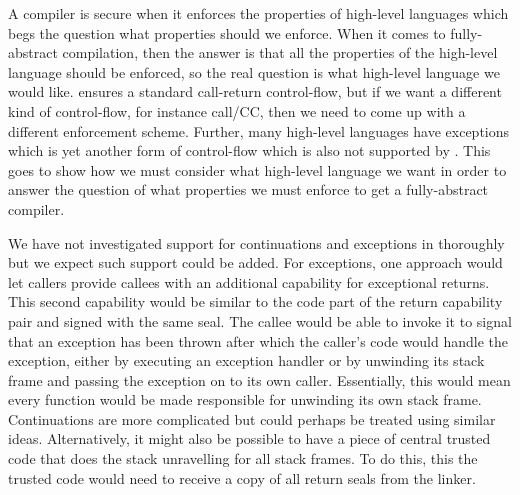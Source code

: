 

\begin{jversion}
  A compiler is secure when it enforces the properties of high-level languages which begs the question what properties should we enforce.
  When it comes to fully-abstract compilation, then the answer is that all the properties of the high-level language should be enforced, so the real question is what high-level language we would like.
  \stktokens{} ensures a standard call-return control-flow, but if we want a different kind of control-flow, for instance call/CC, then we need to come up with a different enforcement scheme.
  Further, many high-level languages have exceptions which is yet another form of control-flow which is also not supported by \stktokens{}.
  This goes to show how we must consider what high-level language we want in order to answer the question of what properties we must enforce to get a fully-abstract compiler.

  We have not investigated support for continuations and exceptions in \stktokens{} thoroughly but we expect such support could be added.
  For exceptions, one approach would let callers provide callees with an additional capability for exceptional returns.
  This second capability would be similar to the code part of the return capability pair and signed with the same seal.
  The callee would be able to invoke it to signal that an exception has been thrown after which the caller's code would handle the exception, either by executing an exception handler or by unwinding its stack frame and passing the exception on to its own caller.
  Essentially, this would mean every function would be made responsible for unwinding its own stack frame.
  Continuations are more complicated but could perhaps be treated using similar ideas.
  Alternatively, it might also be possible to have a piece of central trusted code that does the stack unravelling for all stack frames.
  To do this, this the trusted code would need to receive a copy of all return seals from the linker.


\end{jversion}
